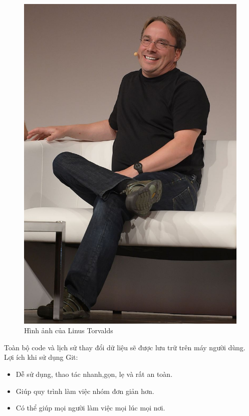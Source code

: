 \documentclass[a4paper]{report}
\begin{document}
\begin{figure}[ht]
    \centering
    \includegraphics[scale=0.7]{Linus Torvalds.jpg}
    \caption{Hình ảnh của Linus Torvalds}
\end{figure}

\textrm{Toàn bộ code và lịch sử thay đổi dữ liệu sẽ được lưu trữ trên máy người dùng.}
\textrm{Lợi ích khi sử dụng Git:}
\begin{itemize}
    \item \textrm{Dễ sử dụng, thao tác nhanh,gọn, lẹ và rất an toàn.}
    \item \textrm{Giúp quy trình làm việc nhóm đơn giản hơn.}
    \item \textrm{Có thể giúp mọi người làm việc mọi lúc mọi nơi.}
\end{itemize}
\end{document}
